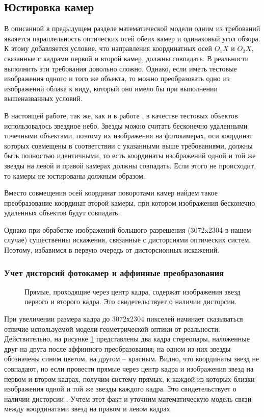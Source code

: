 \subsection{Юстировка камер}\label{cam_tuning}
В описанной в предыдущем разделе математической модели одним из требований является параллельность оптических осей обеих камер и одинаковый угол обзора.
К этому добавляется условие, что направления координатных осей $O_1X$ и $O_2X$, связанные с кадрами первой и второй камер, должны совпадать. В реальности выполнить эти требования довольно сложно. Однако, если иметь тестовые изображения одного и того же объекта, то можно преобразовать одно из изображений облака к виду, который оно имело бы при выполнении вышеназванных условий.

В настоящей работе, так же, как и в работе \cite{book:andreev_diplom}, в качестве тестовых объектов использовалось звездное небо. Звезды можно считать бесконечно удаленными точечными объектами, поэтому их изображения на фотокамерах, оси координат которых совмещены в соответствии с указанными выше требованиями, должны быть полностью идентичными, то есть координаты изображений одной и той же звезды на левой и правой камерах должны совпадать. Если этого не происходит, то камеры не юстированы должным образом.

Вместо совмещения осей координат поворотами камер найдем такое преобразование координат второй камеры, при котором изображения бесконечно удаленных объектов будут совпадать.

Однако при обработке изображений большого разрешения (3072x2304 в нашем случае) существенны искажения, связанные с дисторсиями оптических систем. Поэтому, избавимся в первую очередь от дисторсионных искажений.
%
%

\subsubsection{Учет дисторсий фотокамер и аффинные преобразования}\label{distortion_affine}

\begin{figure}[h]
\caption{Прямые, проходящие через центр кадра, содержат изображения звезд первого и второго кадра. Это свидетельствует о наличии дисторсии.}
\label{img:starlines}
\end{figure}

При увеличении размера кадра до 3072х2304 пикселей начинает сказываться отличие используемой  модели геометрической оптики от реальности. Действительно, на рисунке \ref{img:starlines} представлены два кадра стереопары, наложенные друг на друга после аффинного преобразования; на одном из них звезды обозначены синим цветом, на другом – красным. Видно, что координаты звезд не совпадают, но если провести прямые через центр кадра и изображения звезд на первом и втором кадрах, получим систему прямых, к каждой из которых близки изображения одной и той же звезды каждого кадра. Это свидетельствует о наличии дисторсии \cite[стр.~73]{book:optic}. Учтем этот факт и уточним математическую модель связи между координатами звезд на правом и левом кадрах.

